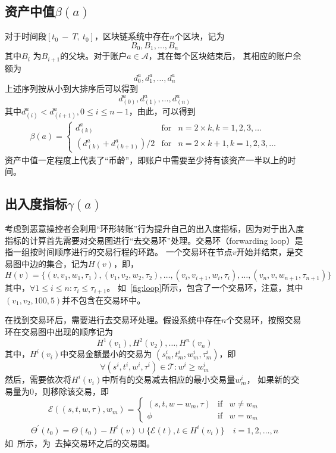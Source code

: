 \subsection{资产中值$\beta(a)$}
对于时间段$[t_0\ −\ T,\ t_0]$，区块链系统中存在$n$个区块，记为
\[
B_0, B_1, \dots, B_n
\]
\noindent 其中$B_{i}$ 为$B_{i+1}$的父块。对于账户$a \in \mathcal{A}$，其在每个区块结束后，
其相应的账户余额为
\[
d^a_0, d^a_1, \dots, d^a_n
\]
上述序列按从小到大排序后可以得到
\[
d^a_{(0)}, d^a_{(1)}, \dots, d^a_{(n)}
\]
其中$d^a_{(i)} < d^a_{(i+1)}, 0\le i \le {n-1}$，由此，可以得到
\begin{align}
\beta(a) = \left\{ \begin{array}{rcl}
{d^a_{(k)}} & \mbox{for} & n=2\times{}k, k=1, 2, 3, \ldots \\
{(d^a_{(k)} + d^a_{(k+1)})/2} & \mbox{for} & n=2\times{}k + 1, k=1, 2, 3, \ldots
\end{array}\right.
\end{align}
资产中值一定程度上代表了“币龄”，即账户中需要至少持有该资产一半以上的时间。

\subsection{出入度指标$\gamma(a)$}
考虑到恶意操控者会利用“环形转账”行为提升自己的出入度指标，因为对于出入度指标的计算首先需要对交易图进行“去交易环”处理。交易环（forwarding loop）是指一组按时间顺序进行的交易行程的环路。
一个交易环在节点$v$开始并结束，是交易图中边的集合，记为$H(v)$，即，
\[
H(v) = \{(v, v_1, w_1, \tau_1), (v_1, v_2, w_2, \tau_2), \dots, (v_i, v_{i+1}, w_{i}, \tau_i), \dots, (v_n, v, w_{n+1}, \tau_{n+1})\}
\]
\noindent 其中，$\forall 1\le i \le n : \tau_i \le \tau_{i+1} $。
\noindent 如~\ref{fig:loop}所示，包含了一个交易环，注意，其中$(v_1, v_2, 100, 5)$并不包含在交易环中。




在找到交易环后，需要进行去交易环处理。假设系统中存在$n$个交易环，按照交易环在交易图中出现的顺序记为
\[
H^1(v_1), H^2(v_2), \dots, H^n(v_n)\]
\noindent 其中，$H^i(v_i)$中交易金额最小的交易为 $(s^i_m, t^i_m, w^i_m, \tau^i_m)$，即
\[
\forall (s^i, t^i, w^i, \tau^i) \in \mathcal{T} : w^i \ge w^i_m
\]
\noindent 然后，需要依次将$H^i(v_i)$中所有的交易减去相应的最小交易量$w^i_m$，
如果新的交易量为0，则移除该交易，即
\[
\mathcal{E}((s, t, w, \tau), w_m) = \left\{ \begin{array}{rcl}
(s, t, w-w_m, \tau) & \mbox{if} & w \ne w_m \\
\phi & \mbox{if} & w = w_m
\end{array}\right.
\]
\begin{align}
\Theta^{\prime}(t_0)=\Theta(t_0)-H^i(v) \cup \{\mathcal{E}(t), t\in H^i(v_i)\} \quad i = 1, 2,\dots, n
\end{align}
\noindent 如~所示，为~去掉交易环之后的交易图。


